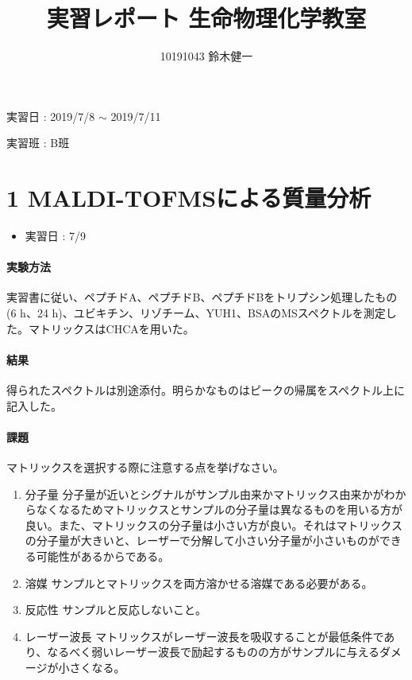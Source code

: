 \documentclass[a4paper,papersize,dvipdfmx]{jsarticle}
\begin{document}
\title{実習レポート 生命物理化学教室}
\author{10191043 鈴木健一}
\date{}
\maketitle



\begin{flushright}
実習日 : 2019/7/8 $\sim$ 2019/7/11

実習班 :  B班
\end{flushright}


\part*{1 MALDI-TOFMSによる質量分析}

\begin{itemize}
\item 実習日 : 7/9

\end{itemize}
\subsection*{実験方法}

実習書に従い、ペプチドA、ペプチドB、ペプチドBをトリプシン処理したもの(6 h、24 h)、ユビキチン、リゾチーム、YUH1、BSAのMSスペクトルを測定した。マトリックスはCHCAを用いた。

\subsection*{結果}
得られたスペクトルは別途添付。明らかなものはピークの帰属をスペクトル上に記入した。


\subsection*{課題}


\begin{tcolorbox}[colback=white,colbacktitle=black!10!white,coltitle=black,title={1．}]
マトリックスを選択する際に注意する点を挙げなさい。
\end{tcolorbox}

\begin{enumerate}
\item 分子量
分子量が近いとシグナルがサンプル由来かマトリックス由来かがわからなくなるためマトリックスとサンプルの分子量は異なるものを用いる方が良い。また、マトリックスの分子量は小さい方が良い。それはマトリックスの分子量が大きいと、レーザーで分解して小さい分子量が小さいものができる可能性があるからである。

\item 溶媒
サンプルとマトリックスを両方溶かせる溶媒である必要がある。

\item 反応性
サンプルと反応しないこと。

\item レーザー波長
マトリックスがレーザー波長を吸収することが最低条件であり、なるべく弱いレーザー波長で励起するものの方がサンプルに与えるダメージが小さくなる。
\end{enumerate}
\end{document}
